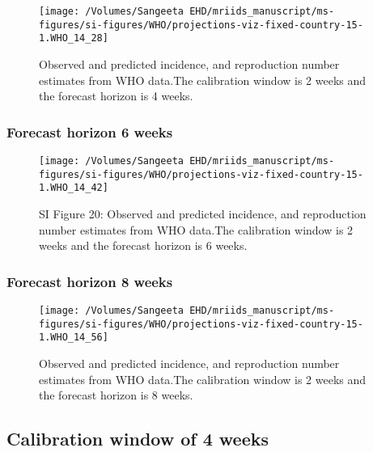 \documentclass[11pt,]{article}
\begin{document}
\begin{figure}

  {
    \centering \texttt{[image: /Volumes/Sangeeta EHD/mriids\_manuscript/ms-figures/si-figures/WHO/projections-viz-fixed-country-15-1.WHO\_14\_28]} 

  }

  \caption{Observed and predicted incidence, and reproduction number
    estimates from WHO data.The calibration window is 2 weeks and the
    forecast horizon is 4 weeks.}
  \label{fig:who24}
\end{figure}

\hypertarget{forecast-horizon-6-weeks-6}{%
  \subsubsection{Forecast horizon 6 weeks}\label{forecast-horizon-6-weeks-6}}

\begin{figure}

  {\centering \texttt{[image: /Volumes/Sangeeta EHD/mriids\_manuscript/ms-figures/si-figures/WHO/projections-viz-fixed-country-15-1.WHO\_14\_42]} 

  }

  \caption{SI Figure  20: Observed and predicted incidence, and
    reproduction number estimates from WHO data.The calibration window
    is 2 weeks and the forecast horizon is 6 weeks.}
  \label{fig:who26}
\end{figure}

\hypertarget{forecast-horizon-8-weeks-6}{%
  \subsubsection{Forecast horizon 8
    weeks}\label{forecast-horizon-8-weeks-6}}

\begin{figure}

  {\centering \texttt{[image: /Volumes/Sangeeta EHD/mriids\_manuscript/ms-figures/si-figures/WHO/projections-viz-fixed-country-15-1.WHO\_14\_56]} 

  }

  \caption{Observed and predicted incidence, and reproduction number
    estimates from WHO data.The calibration window is 2 weeks and the
    forecast horizon is 8 weeks.}
  \label{fig:who28}
\end{figure}

\hypertarget{calibration-window-of-4-weeks-2}{%
  \subsection{Calibration window of 4
    weeks}\label{calibration-window-of-4-weeks-2}}
\end{document}
